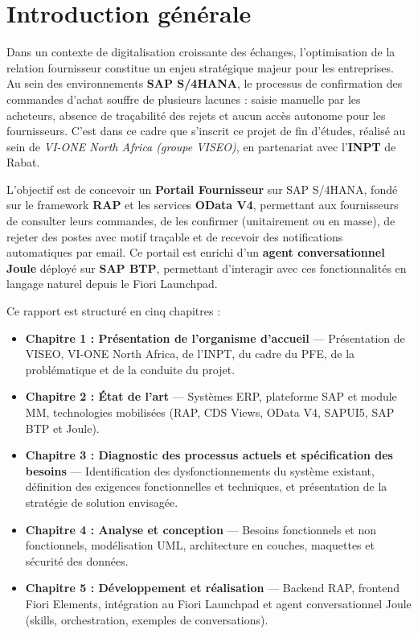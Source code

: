 \documentclass[12pt,a4paper,oneside]{report}
\begin{document}
\setcounter{tocdepth}{2}
\tableofcontents

\listoffigures
\listoftables

\clearpage
{}
\setcounter{page}{1}

\chapter*{Introduction g\'en\'erale}
{}
\label{ch:intro-gen}
\begingroup
\setlength{\parindent}{1.2em}
\setlength{\parskip}{0pt}

Dans un contexte de digitalisation croissante des échanges, l'optimisation de la relation
fournisseur constitue un enjeu stratégique majeur pour les entreprises. Au sein des
environnements \textbf{SAP S/4HANA}, le processus de confirmation des commandes d'achat
souffre de plusieurs lacunes : saisie manuelle par les acheteurs, absence de traçabilité
des rejets et aucun accès autonome pour les fournisseurs. C'est dans ce cadre que s'inscrit
ce projet de fin d'études, réalisé au sein de \textit{VI-ONE North Africa (groupe VISEO)},
en partenariat avec l'\textbf{INPT} de Rabat.

L'objectif est de concevoir un \textbf{Portail Fournisseur} sur SAP S/4HANA, fondé sur
le framework \textbf{RAP} et les services \textbf{OData V4}, permettant aux fournisseurs
de consulter leurs commandes, de les confirmer (unitairement ou en masse), de rejeter des
postes avec motif traçable et de recevoir des notifications automatiques par email.
Ce portail est enrichi d'un \textbf{agent conversationnel Joule} déployé sur \textbf{SAP BTP},
permettant d'interagir avec ces fonctionnalités en langage naturel depuis le Fiori Launchpad.

Ce rapport est structuré en cinq chapitres :

\begin{itemize}[label=---,itemsep=0.15em,topsep=0.2em]
\item \textbf{Chapitre 1 : Présentation de l'organisme d'accueil} ---
Présentation de VISEO, VI-ONE North Africa, de l'INPT, du cadre du PFE,
de la problématique et de la conduite du projet.
\item \textbf{Chapitre 2 : État de l'art} ---
Systèmes ERP, plateforme SAP et module MM, technologies mobilisées
(RAP, CDS Views, OData V4, SAPUI5, SAP BTP et Joule).
\item \textbf{Chapitre 3 : Diagnostic des processus actuels et spécification des besoins} ---
Identification des dysfonctionnements du système existant, définition des exigences fonctionnelles et techniques,
et présentation de la stratégie de solution envisagée.
\item \textbf{Chapitre 4 : Analyse et conception} ---
Besoins fonctionnels et non fonctionnels, modélisation UML,
architecture en couches, maquettes et sécurité des données.
\item \textbf{Chapitre 5 : Développement et réalisation} ---
Backend RAP, frontend Fiori Elements, intégration au Fiori Launchpad
et agent conversationnel Joule (skills, orchestration, exemples de conversations).
\end{itemize}
\end{document}
